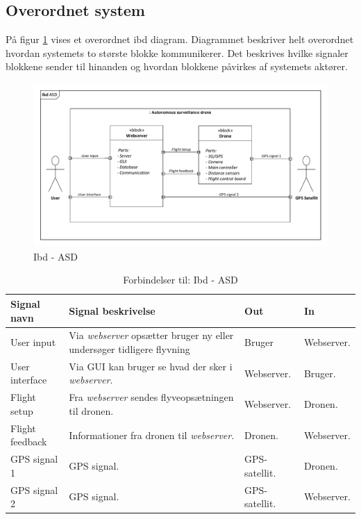 \subsection{Overordnet system}

På figur \ref{fig:ibd_overordnet} vises et overordnet ibd diagram. Diagrammet beskriver helt overordnet hvordan systemets to største blokke kommunikerer. Det beskrives hvilke signaler blokkene sender til hinanden og hvordan blokkene påvirkes af systemets aktører. 

\begin{figure}[H]
\centering
\includegraphics[width=1\textwidth]{Billeder/IBD/ibd1_overordnet.pdf}
\vspace{-1cm}
\caption{Ibd - ASD}
\label{fig:ibd_overordnet}
\end{figure}

\begin{table}[H]
	\centering
		\begin{tabular}{|p{2.6 cm}|p{4.9 cm}|p{2.5 cm}|p{2.5 cm}|} 
		\hline
			\textbf{Signal navn} 	& \textbf{Signal beskrivelse}		& \textbf{Out} 				& \textbf{In}     \\ \hline
			User input 			& Via \textit{webserver} opsætter bruger ny eller undersøger tidligere flyvning & Bruger 		& Webserver.			    \\ \hline
			User interface 		& Via GUI kan bruger se hvad der sker i \textit{webserver}.	& Webserver.			& Bruger.				\\ \hline
			Flight setup		& Fra \textit{webserver} sendes flyveopsætningen til dronen.	& Webserver.	& Dronen.	\\ \hline
			Flight feedback		& Informationer fra dronen til \textit{webserver}.	& 	Dronen.		& Webserver.			    \\ \hline
			GPS signal 1		& GPS signal.	& GPS-satellit.			& Dronen.				\\ \hline
			GPS signal 2		& GPS signal.	& GPS-satellit.				& Webserver.	\\ \hline  
		\end{tabular}
	\caption{Forbindelser til: Ibd - ASD}
	\label{tab:IBD1}
\end{table}

